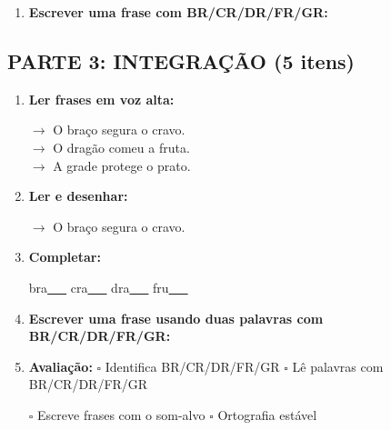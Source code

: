 \begin{exercicio}
\begin{enumerate}[resume]
  \item \textbf{Escrever uma frase com BR/CR/DR/FR/GR:}
  \begin{center}
  \underline{\hspace{12cm}}
  \end{center}

\end{enumerate}

\subsection*{PARTE 3: INTEGRAÇÃO (5 itens)}

\begin{enumerate}[resume]

  \item \textbf{Ler frases em voz alta:}
  \begin{center}
  $\rightarrow$ O braço segura o cravo.\\
  $\rightarrow$ O dragão comeu a fruta.\\
  $\rightarrow$ A grade protege o prato.\\
  \end{center}

  \item \textbf{Ler e desenhar:}
  \begin{center}
  $\rightarrow$ O braço segura o cravo.
  \end{center}
  \begin{center}
  \end{center}

  \item \textbf{Completar:}
  \begin{center}
  bra\underline{~~~} \quad cra\underline{~~~} \quad dra\underline{~~~} \quad fru\underline{~~~}
  \end{center}

  \item \textbf{Escrever uma frase usando duas palavras com BR/CR/DR/FR/GR:}
  \begin{center}
  \underline{\hspace{12cm}}
  \end{center}

  \item \textbf{Avaliação:} $\square$ Identifica BR/CR/DR/FR/GR \quad $\square$ Lê palavras com BR/CR/DR/FR/GR
  \begin{center}
  $\square$ Escreve frases com o som-alvo \quad $\square$ Ortografia estável
  \end{center}


\end{enumerate}
\end{exercicio}
